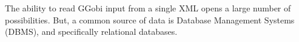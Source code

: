 \documentclass{article}
\begin{document}
The ability to read GGobi input from a single XML opens a large number
of possibilities.  But, a common source of data is Database Management
Systems (DBMS), and specifically relational databases.
\end{document}

